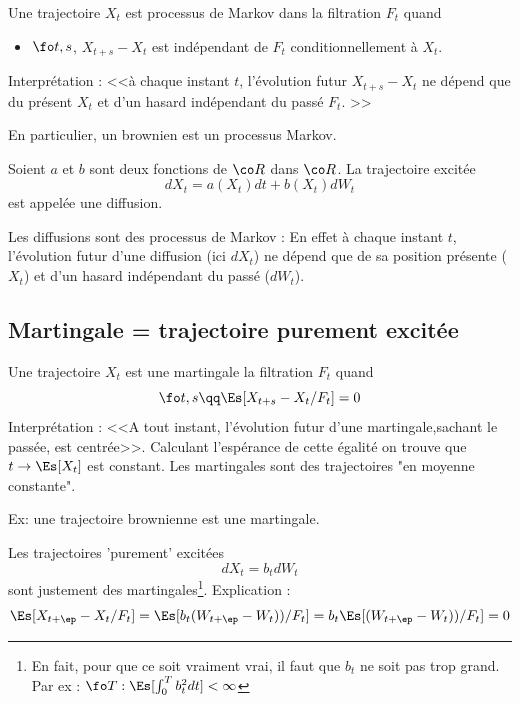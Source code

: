 \documentclass{article}
\begin{document}
Une trajectoire $X_t$ est processus de Markov dans la filtration $F_t$ quand
\begin{itemize}
\item $\fo t,s$,   $X_{t+s}-X_t$ est indépendant de $F_t$ conditionnellement à $X_t$. 
\end{itemize}
Interprétation : <<à chaque instant $t$, l'évolution futur   $X_{t+s}-X_t$  ne dépend que du présent $X_t$ et d'un hasard indépendant du  passé $F_t$. >>


En particulier, un brownien est un processus Markov.  


\begin{definition} Soient $a$ et $b$ sont deux fonctions de $\co R$ dans $\co R$. La trajectoire excitée  
$$
dX_t= a(X_t) dt + b(X_t) dW_t
$$
est  appelée une diffusion.
\end {definition}

 Les diffusions sont des processus de Markov : En effet à chaque instant $t$, l'évolution futur d'une diffusion (ici $ dX_t$) ne dépend que de sa position présente ($X_t$) et d'un hasard indépendant du passé ($dW_t$).





\subsection{Martingale = trajectoire purement excitée}

Une trajectoire $X_t$ est une martingale la filtration $F_t$ quand
$$
\fo t,s \qq \Es[ X_{t+s}-X_t   /  F_t  ] =  0
$$
Interprétation : <<A tout instant, l'évolution futur d'une martingale,sachant le passée, est centrée>>. Calculant l'espérance de cette égalité on trouve que $t\to \Es[X_t] $ est constant. Les martingales sont des trajectoires "en moyenne constante". 

Ex: une trajectoire brownienne est une martingale.   


Les trajectoires 'purement' excitées 
$$
dX_t = b_t  dW_t
$$
sont justement des martingales\footnote{En fait, pour que ce soit vraiment vrai, il faut que $b_t$ ne soit pas trop grand. Par ex : $\fo T:\Es[\int_0^T b^2_t dt ]<\infty$}.  Explication :
$$
\Es[ X_{t+\ep}-X_t / F_t] = \Es[ b_t (W_{t+\ep}-W_t)) / F_t] = b_t \Es[ (W_{t+\ep}-W_t)) / F_t]  = 0 
$$
\end{document}
